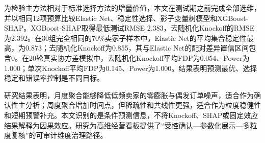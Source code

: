 \documentclass{sufethesismas}
\begin{document}
\begin{abstractCN}
为检验主方法相对于标准选择方法的增量价值，本文在测试期之前完成全部选维，并以相同12项预算比较Elastic Net、稳定性选择、影子变量树模型和XGBoost-SHAP。XGBoost-SHAP取得最低测试RMSE 2.383，去随机化Knockoff的RMSE为2.392。在30组完全相同的70\%卖家子样本中，Elastic Net的平均集合稳定性最高，为0.873；去随机化Knockoff为0.855，其与Elastic Net的配对差异置信区间包含0。在20轮真实协方差模拟中，去随机化Knockoff平均FDP为0.054、Power为1.000；单次Knockoff平均FDP为0.145、Power为1.000。结果表明预测最优、选择稳定和错误率控制是不同目标。

研究结果表明，月度聚合能够降低低频卖家的零膨胀与偶发订单噪声，适合作为确认性主分析；周度聚合增加时间点，但稀疏性和共线性更强，适合作为粒度稳健性和短期预警补充。本文识别的是条件预测信息，不将Knockoff、SHAP或固定效应结果解释为因果效应。研究为高维经营看板提供了``受控确认---参数化展示---多粒度复核''的可审计维度治理路径。
\end{abstractCN}
\end{document}
